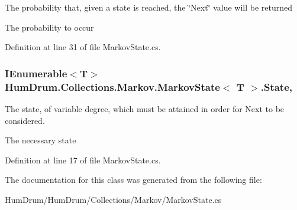 The probability that, given a state is reached, the \char`\"{}\+Next\char`\"{} value will be returned 

The probability to occur

Definition at line 31 of file Markov\+State.\+cs.

\subsubsection[{\texorpdfstring{State}{State}}]{\setlength{\rightskip}{0pt plus 5cm}I\+Enumerable$<$T$>$ {\bf Hum\+Drum.\+Collections.\+Markov.\+Markov\+State}$<$ T $>$.State\hspace{0.3cm}{\ttfamily [get]}, {\ttfamily [set]}}\hypertarget{classHumDrum_1_1Collections_1_1Markov_1_1MarkovState_a6af42036b04d84e26d06ee5d86790094}{}\label{classHumDrum_1_1Collections_1_1Markov_1_1MarkovState_a6af42036b04d84e26d06ee5d86790094}


The state, of variable degree, which must be attained in order for Next to be considered. 

The necessary state

Definition at line 17 of file Markov\+State.\+cs.



The documentation for this class was generated from the following file\+:\begin{DoxyCompactItemize}
\item 
Hum\+Drum/\+Hum\+Drum/\+Collections/\+Markov/Markov\+State.\+cs\end{DoxyCompactItemize}
